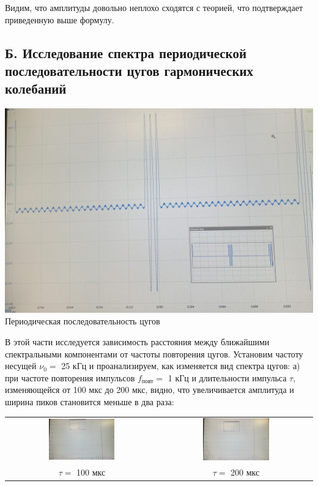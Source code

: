 \documentclass[a4paper,12pt]{article} %
\begin{document}
\hfill \break Видим, что амплитуды довольно неплохо сходятся с теорией, что подтверждает приведенную выше формулу.

\subsection{Б. Исследование спектра периодической последовательности цугов гармонических колебаний}

\begin{center}
\includegraphics[width=0.6\linewidth]{20.jpg}\\
Периодическая последовательность цугов\\
\end{center}

\hfill \break В этой части исследуется зависимость расстояния между ближайшими спектральными компонентами от частоты повторения цугов. Установим частоту несущей $\nu_{0}=$ 25 кГц и проанализируем, как изменяется вид спектра цугов:
\hfill \break \hfill \break а) при частоте повторения импульсов $f_\text{повт}=$ 1 кГц и длительности импульса $\tau$, изменяющейся от 100 мкс до 200 мкс, видно, что увеличивается амплитуда и ширина пиков становится меньше в два раза:

\hfill \break \begin{center}
\begin{tabular}{cc}
\includegraphics[width=0.45\textwidth]{9.jpg}&\includegraphics[width=0.45\textwidth]{10.jpg}\\
$\tau=$ 100 мкс&$\tau=$ 200 мкс\\
\end{tabular}
\end{center}
\end{document}
